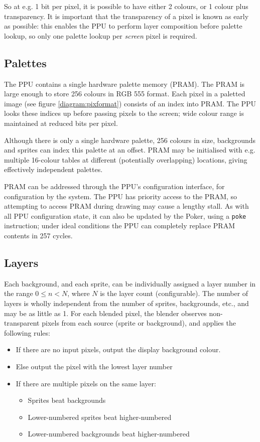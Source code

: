 So at e.g. 1 bit per pixel, it is possible to have either 2 colours, or 1 colour plus transparency. It is important that the transparency of a pixel is known as early as possible: this enables the PPU to perform layer composition before palette lookup, so only one palette lookup per {\it screen} pixel is required.


\subsection{Palettes}

The PPU contains a single hardware palette memory (PRAM). The PRAM is large enough to store 256 colours in RGB 555 format. Each pixel in a paletted image (see figure \ref{diagram:pixformat}) consists of an index into PRAM. The PPU looks these indices up before passing pixels to the screen; wide colour range is maintained at reduced bits per pixel.

Although there is only a single hardware palette, 256 colours in size, backgrounds and sprites can index this palette at an offset. PRAM may be initialised with e.g. multiple 16-colour tables at different (potentially overlapping) locations, giving effectively independent palettes.

PRAM can be addressed through the PPU's configuration interface, for configuration by the system. The PPU has priority access to the PRAM, so attempting to access PRAM during drawing may cause a lengthy stall. As with all PPU configuration state, it can also be updated by the Poker, using a {\tt poke} instruction; under ideal conditions the PPU can completely replace PRAM contents in 257 cycles.

\subsection{Layers}

Each background, and each sprite, can be individually assigned a layer number in the range $0 \leq n < N$, where $N$ is the layer count (configurable). The number of layers is wholly independent from the number of sprites, backgrounds, etc., and may be as little as 1. For each blended pixel, the blender observes non-transparent pixels from each source (sprite or background), and applies the following rules:

\begin{itemize}
	\item If there are no input pixels, output the display background colour.
	\item Else output the pixel with the lowest layer number
	\item If there are multiple pixels on the same layer:
	\begin{itemize}
		\item Sprites beat backgrounds
		\item Lower-numbered sprites beat higher-numbered
		\item Lower-numbered backgrounds beat higher-numbered
	\end{itemize}
\end{itemize}

